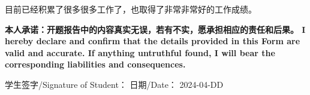 \documentclass[a4paper,zihao=-4,AutoFakeBold]{ctexart}
\begin{document}
目前已经积累了很多很多工作了，也取得了非常非常好的工作成绩。




\vspace{\baselineskip}

\bfseries\fangsong
\noindent
本人承诺：开题报告中的内容真实无误，若有不实，愿承担相应的责任和后果。
I hereby declare and confirm that the details
provided in this Form are valid and accurate.
If anything untruthful found,
I will bear the corresponding liabilities and consequences.

\vspace{\baselineskip}

\noindent
学生签字/Signature of Student： 
\hfill
日期/Date： 2024-04-DD
\end{document}
